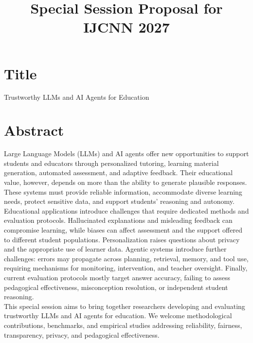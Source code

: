 \documentclass{article}
\title{Special Session Proposal for IJCNN 2027}
\author{}
\date{}
\begin{document}
\maketitle

\section*{Title}
\noindent
Trustworthy LLMs and AI Agents for Education

\section*{Abstract}
\noindent
Large Language Models (LLMs) and AI agents offer new opportunities to support students and educators through personalized tutoring, learning material generation, automated assessment, and adaptive feedback. Their educational value, however, depends on more than the ability to generate plausible responses. These systems must provide reliable information, accommodate diverse learning needs, protect sensitive data, and support students’ reasoning and autonomy.\\
Educational applications introduce challenges that require dedicated methods and evaluation protocols. Hallucinated explanations and misleading feedback can compromise learning, while biases can affect assessment and the support offered to different student populations. Personalization raises questions about privacy and the appropriate use of learner data. Agentic systems introduce further challenges: errors may propagate across planning, retrieval, memory, and tool use, requiring mechanisms for monitoring, intervention, and teacher oversight. Finally, current evaluation protocols mostly target answer accuracy, failing to assess pedagogical effectiveness, misconception resolution, or independent student reasoning.  \\
This special session aims to bring together researchers developing and evaluating trustworthy LLMs and AI agents for education. We welcome methodological contributions, benchmarks, and empirical studies addressing reliability, fairness, transparency, privacy, and pedagogical effectiveness. \\
\end{document}
